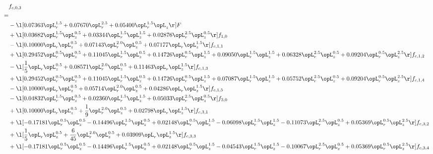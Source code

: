 \begin{alignat}{2} 
\label{eq:f_03_2} 
& f_{c,0,3} \nonumber \\ 
 = \\ 
& - \l[  0.07363 \opL_r^{1.5} +  0.07670 \opL_r^{2.5} +  0.05400 \opL_r^{1.5} \opL_z  \r] F \nonumber \\ 
& + \l[  0.03682 \opL_r^{1.5} \opL_z^{0.5} +  0.03344 \opL_r^{1.5} \opL_z^{1.5} +  0.02876 \opL_r^{2.5} \opL_z^{0.5}  \r] f_{1,0} \nonumber \\ 
& - \l[  0.10000 \opL_r \opL_z^{0.5} +  0.07143 \opL_r^{2.0} \opL_z^{0.5} +  0.07177 \opL_r \opL_z^{1.5}  \r] f_{c,1,1} \nonumber \\ 
& + \l[  0.29452 \opL_r^{0.5} \opL_z^{0.5} +  0.11045 \opL_r^{1.5} \opL_z^{0.5} +  0.14726 \opL_r^{0.5} \opL_z^{1.5} +  0.09050 \opL_r^{1.5} \opL_z^{1.5} +  0.06328 \opL_r^{2.5} \opL_z^{0.5} +  0.09204 \opL_r^{0.5} \opL_z^{2.5}  \r] f_{c,1,2} \nonumber \\ 
& - \l[ \frac{1}{5} \opL_r \opL_z^{0.5} +  0.08571 \opL_r^{2.0} \opL_z^{0.5} +  0.11463 \opL_r \opL_z^{1.5}  \r] f_{c,1,3} \nonumber \\ 
& + \l[  0.29452 \opL_r^{0.5} \opL_z^{0.5} +  0.11045 \opL_r^{1.5} \opL_z^{0.5} +  0.14726 \opL_r^{0.5} \opL_z^{1.5} +  0.07087 \opL_r^{1.5} \opL_z^{1.5} +  0.05752 \opL_r^{2.5} \opL_z^{0.5} +  0.09204 \opL_r^{0.5} \opL_z^{2.5}  \r] f_{c,1,4} \nonumber \\ 
& - \l[  0.10000 \opL_r \opL_z^{0.5} +  0.05714 \opL_r^{2.0} \opL_z^{0.5} +  0.04286 \opL_r \opL_z^{1.5}  \r] f_{c,1,5} \nonumber \\ 
& - \l[  0.04832 \opL_r^{1.5} \opL_z^{0.5} +  0.02360 \opL_r^{1.5} \opL_z^{1.5} +  0.05033 \opL_r^{2.5} \opL_z^{0.5}  \r] f_{3,0} \nonumber \\ 
& + \l[  0.10000 \opL_r \opL_z^{0.5} + \frac{1}{9} \opL_r^{2.0} \opL_z^{0.5} +  0.02798 \opL_r \opL_z^{1.5}  \r] f_{c,3,1} \nonumber \\ 
& + \l[  -0.17181 \opL_r^{0.5} \opL_z^{0.5}   -0.14496 \opL_r^{1.5} \opL_z^{0.5} +  0.02148 \opL_r^{0.5} \opL_z^{1.5}   -0.06098 \opL_r^{1.5} \opL_z^{1.5}   -0.11073 \opL_r^{2.5} \opL_z^{0.5} +  0.05369 \opL_r^{0.5} \opL_z^{2.5}  \r] f_{c,3,2} \nonumber \\ 
& + \l[ \frac{1}{5} \opL_r \opL_z^{0.5} + \frac{6}{45} \opL_r^{2.0} \opL_z^{0.5} +  0.03909 \opL_r \opL_z^{1.5}  \r] f_{c,3,3} \nonumber \\ 
& + \l[  -0.17181 \opL_r^{0.5} \opL_z^{0.5}   -0.14496 \opL_r^{1.5} \opL_z^{0.5} +  0.02148 \opL_r^{0.5} \opL_z^{1.5}   -0.04543 \opL_r^{1.5} \opL_z^{1.5}   -0.10067 \opL_r^{2.5} \opL_z^{0.5} +  0.05369 \opL_r^{0.5} \opL_z^{2.5}  \r] f_{c,3,4} \nonumber \\ 

\end{alignat}
